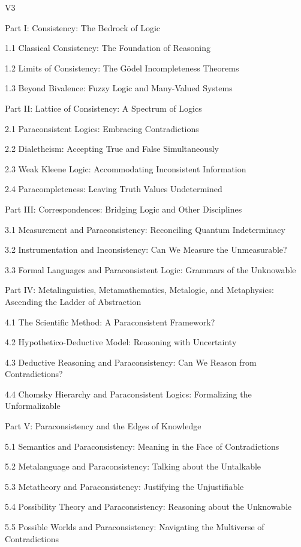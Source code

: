 V3

Part I: Consistency: The Bedrock of Logic

1.1 Classical Consistency: The Foundation of Reasoning

1.2 Limits of Consistency: The Gödel Incompleteness Theorems

1.3 Beyond Bivalence: Fuzzy Logic and Many-Valued Systems

Part II: Lattice of Consistency: A Spectrum of Logics

2.1 Paraconsistent Logics: Embracing Contradictions

2.2 Dialetheism: Accepting True and False Simultaneously

2.3 Weak Kleene Logic: Accommodating Inconsistent Information

2.4 Paracompleteness: Leaving Truth Values Undetermined

Part III: Correspondences: Bridging Logic and Other Disciplines

3.1 Measurement and Paraconsistency: Reconciling Quantum Indeterminacy

3.2 Instrumentation and Inconsistency: Can We Measure the Unmeasurable?

3.3 Formal Languages and Paraconsistent Logic: Grammars of the
Unknowable

Part IV: Metalinguistics, Metamathematics, Metalogic, and Metaphysics:
Ascending the Ladder of Abstraction

4.1 The Scientific Method: A Paraconsistent Framework?

4.2 Hypothetico-Deductive Model: Reasoning with Uncertainty

4.3 Deductive Reasoning and Paraconsistency: Can We Reason from
Contradictions?

4.4 Chomsky Hierarchy and Paraconsistent Logics: Formalizing the
Unformalizable

Part V: Paraconsistency and the Edges of Knowledge

5.1 Semantics and Paraconsistency: Meaning in the Face of Contradictions

5.2 Metalanguage and Paraconsistency: Talking about the Untalkable

5.3 Metatheory and Paraconsistency: Justifying the Unjustifiable

5.4 Possibility Theory and Paraconsistency: Reasoning about the
Unknowable

5.5 Possible Worlds and Paraconsistency: Navigating the Multiverse of
Contradictions

